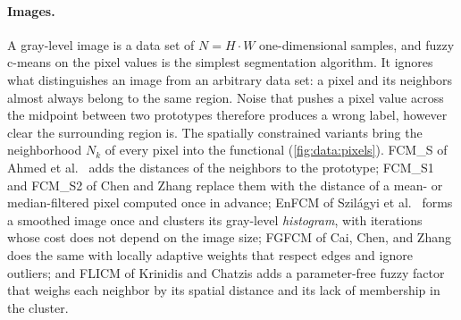 \paragraph{Images.} A gray-level image is a data set of $N=H\cdot W$ one-dimensional samples, and fuzzy c-means on the pixel values is the simplest segmentation algorithm. It ignores what distinguishes an image from an arbitrary data set: a pixel and its neighbors almost always belong to the same region. Noise that pushes a pixel value across the midpoint between two prototypes therefore produces a wrong label, however clear the surrounding region is. The spatially constrained variants bring the neighborhood $N_k$ of every pixel into the functional (\cref{fig:data:pixels}). FCM\_S of Ahmed et al.\ \cite{ahmed:2002:fcms} adds the distances of the neighbors to the prototype; FCM\_S1 and FCM\_S2 of Chen and Zhang \cite{chen:2004:fcms12} replace them with the distance of a mean- or median-filtered pixel computed once in advance; EnFCM of Szil\'agyi et al.\ \cite{szilagyi:2003:enfcm} forms a smoothed image once and clusters its gray-level \emph{histogram}, with iterations whose cost does not depend on the image size; FGFCM of Cai, Chen, and Zhang \cite{cai:2007:fgfcm} does the same with locally adaptive weights that respect edges and ignore outliers; and FLICM of Krinidis and Chatzis \cite{krinidis:2010:flicm} adds a parameter-free fuzzy factor that weighs each neighbor by its spatial distance and its lack of membership in the cluster.

